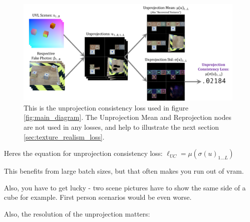 \documentclass{article}
\begin{document}
\begin{figure}[H]
	\begin{center}
		\includegraphics[width=400pt]{../images/unprojection_consistency_loss.pdf}
	\end{center}
	\caption{
		This is the unprojection consistency loss used in figure \ref{fig:main_diagram}.
		The Unprojection Mean and Reprojection nodes are not used in any losses, and help to illustrate the next section \ref{sec:texture_realism_loss}.
	}
	\label{fig:unprojection_consistency_loss}
\end{figure}

Heres the equation for unprojection consistency loss:
$\ell_{UC} = \mu\left(\sigma\left(u\right)_{1 \dots L}\right)$

This benefits from large batch sizes, but that often makes you run out of vram.

Also, you have to get lucky - two scene pictures have to show the same side of a cube for example. First person scenarios would be even worse.

Also, the resolution of the unprojection matters:
\end{document}
